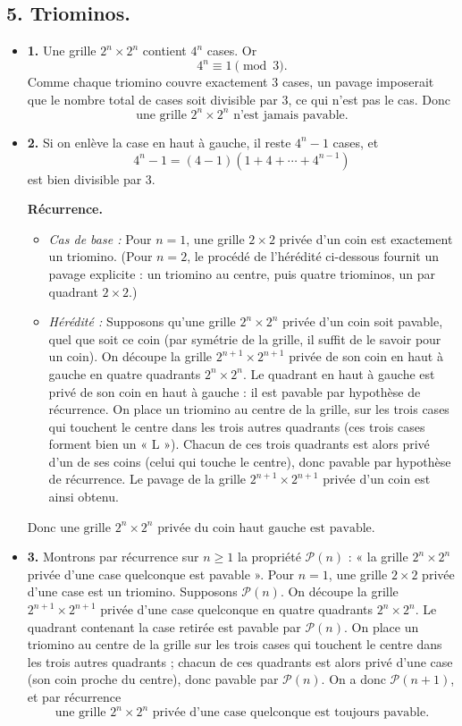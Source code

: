 \subsection*{5. Triominos.}
\begin{itemize}
    \item \textbf{1.} Une grille \(2^n \times 2^n\) contient \(4^n\) cases. Or
    \[4^n \equiv 1 \pmod{3}.\]
    Comme chaque triomino couvre exactement 3 cases, un pavage imposerait que le nombre total de cases soit divisible par 3, ce qui n'est pas le cas. Donc
    \[\boxed{\text{une grille } 2^n \times 2^n \text{ n’est jamais pavable.}}\]

    \item \textbf{2.} Si on enlève la case en haut à gauche, il reste \(4^n - 1\) cases, et
    \[4^n - 1 = (4 - 1)(1 + 4 + \cdots + 4^{n-1})\]
    est bien divisible par 3.

    \textbf{Récurrence.}
    \begin{itemize}
        \item \textit{Cas de base :} Pour \(n = 1\), une grille \(2 \times 2\) privée d’un coin est exactement un triomino. (Pour \(n = 2\), le procédé de l'hérédité ci-dessous fournit un pavage explicite : un triomino au centre, puis quatre triominos, un par quadrant \(2 \times 2\).)
        \item \textit{Hérédité :} Supposons qu'une grille \(2^n \times 2^n\) privée d'un coin soit pavable, quel que soit ce coin (par symétrie de la grille, il suffit de le savoir pour un coin). On découpe la grille \(2^{n+1} \times 2^{n+1}\) privée de son coin en haut à gauche en quatre quadrants \(2^n \times 2^n\). Le quadrant en haut à gauche est privé de son coin en haut à gauche : il est pavable par hypothèse de récurrence. On place un triomino au centre de la grille, sur les trois cases qui touchent le centre dans les trois autres quadrants (ces trois cases forment bien un « L »). Chacun de ces trois quadrants est alors privé d'un de ses coins (celui qui touche le centre), donc pavable par hypothèse de récurrence. Le pavage de la grille \(2^{n+1} \times 2^{n+1}\) privée d'un coin est ainsi obtenu.
    \end{itemize}
    Donc \(\boxed{\text{une grille } 2^n \times 2^n \text{ privée du coin haut gauche est pavable.}}\)

    \item \textbf{3.} Montrons par récurrence sur \(n \geqslant 1\) la propriété \(\mathcal{P}(n)\) : « la grille \(2^n \times 2^n\) privée d'une case quelconque est pavable ». Pour \(n = 1\), une grille \(2 \times 2\) privée d'une case est un triomino. Supposons \(\mathcal{P}(n)\). On découpe la grille \(2^{n+1} \times 2^{n+1}\) privée d'une case quelconque en quatre quadrants \(2^n \times 2^n\). Le quadrant contenant la case retirée est pavable par \(\mathcal{P}(n)\). On place un triomino au centre de la grille sur les trois cases qui touchent le centre dans les trois autres quadrants ; chacun de ces quadrants est alors privé d'une case (son coin proche du centre), donc pavable par \(\mathcal{P}(n)\). On a donc \(\mathcal{P}(n+1)\), et par récurrence
    \[\boxed{\text{une grille } 2^n \times 2^n \text{ privée d’une case quelconque est toujours pavable.}}\]
\end{itemize}
